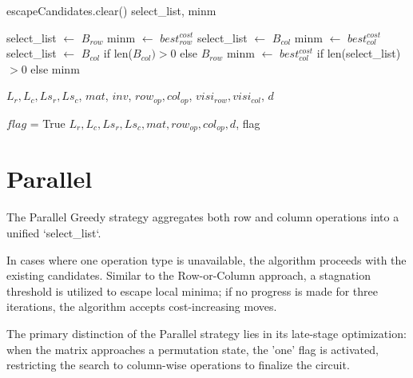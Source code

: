 \begin{algorithm}
\begin{algorithmic}[1]
		\State escapeCandidates.clear()
	    	\State \Return select\_list, minm
		\EndFunction
    \EndIf
    
		\State select\_list $\leftarrow$ $B_{row}$
		\State minm $\leftarrow$ $best_{row}^{cost}$
		\State select\_list $\leftarrow$ $B_{col}$
		\State minm $\leftarrow$ $best_{col}^{cost}$
	\Else
		\State select\_list $\leftarrow$ $B_{col}$ if len($B_{col}) > 0 $ else $B_{row}$
		\State minm $\leftarrow$ $best_{col}^{cost}$ if len(select\_list) $> 0$ else minm
    \EndIf
    
    	\State \Return $L_{r}, L_{c}, Ls_{r}, Ls_{c}$, $mat$, $inv$, $row_{op}, col_{op}$, $visi_{row}, visi_{col}$, $d$
	\EndFunction
    
	    \State $flag$ = True
	    \State \Return
    \EndIf
\EndWhile
\State \Return $L_{r}, L_{c}, Ls_{r}, Ls_{c}, mat, row_{op}, col_{op}, d$, flag
\end{algorithmic}
\end{algorithm}

\section{Parallel}
The Parallel Greedy strategy aggregates both row and column operations into a unified `select\_list`. 

In cases where one operation type is unavailable, the algorithm proceeds with the existing candidates. Similar to the Row-or-Column approach, a stagnation threshold is utilized to escape local minima; if no progress is made for three iterations, the algorithm accepts cost-increasing moves. 

The primary distinction of the Parallel strategy lies in its late-stage optimization: when the matrix approaches a permutation state, the 'one' flag is activated, restricting the search to column-wise operations to finalize the circuit.

